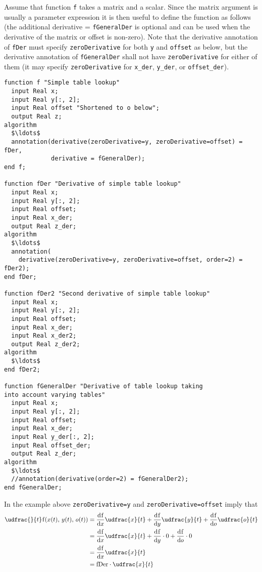 \begin{nonnormative}
Assume that function {\lstinline!f!} takes a matrix and a scalar.
Since the matrix argument is usually a parameter expression it is then
useful to define the function as follows (the additional derivative =
{\lstinline!fGeneralDer!} is optional and can be used when the derivative of
the matrix or offset is non-zero). Note that the derivative annotation of {\lstinline!fDer!} must specify
{\lstinline!zeroDerivative!} for both {\lstinline!y!} and {\lstinline!offset!} as below, but the derivative annotation of {\lstinline!fGeneralDer!} shall not have
{\lstinline!zeroDerivative!} for either of them (it may specify {\lstinline!zeroDerivative!} for {\lstinline!x_der!},
{\lstinline!y_der!}, or {\lstinline!offset_der!}).

\begin{lstlisting}[language=modelica]
function f "Simple table lookup"
  input Real x;
  input Real y[:, 2];
  input Real offset "Shortened to o below";
  output Real z;
algorithm
  $\ldots$
  annotation(derivative(zeroDerivative=y, zeroDerivative=offset) = fDer,
             derivative = fGeneralDer);
end f;

function fDer "Derivative of simple table lookup"
  input Real x;
  input Real y[:, 2];
  input Real offset;
  input Real x_der;
  output Real z_der;
algorithm
  $\ldots$
  annotation(
    derivative(zeroDerivative=y, zeroDerivative=offset, order=2) = fDer2);
end fDer;

function fDer2 "Second derivative of simple table lookup"
  input Real x;
  input Real y[:, 2];
  input Real offset;
  input Real x_der;
  input Real x_der2;
  output Real z_der2;
algorithm
  $\ldots$
end fDer2;

function fGeneralDer "Derivative of table lookup taking
into account varying tables"
  input Real x;
  input Real y[:, 2];
  input Real offset;
  input Real x_der;
  input Real y_der[:, 2];
  input Real offset_der;
  output Real z_der;
algorithm
  $\ldots$
  //annotation(derivative(order=2) = fGeneralDer2);
end fGeneralDer;
\end{lstlisting}
In the example above {\lstinline!zeroDerivative=y!} and {\lstinline!zeroDerivative=offset!} imply that
\begin{equation*}
\begin{aligned}
\udfrac{}{t}\text{{\lstinline!f!}}(x(t),\, y(t),\, o(t))
&= \pdfrac{\text{{\lstinline!f!}}}{x} \udfrac{x}{t} + \pdfrac{\text{{\lstinline!f!}}}{y} \udfrac{y}{t} + \pdfrac{\text{{\lstinline!f!}}}{o} \udfrac{o}{t}\\
&= \pdfrac{\text{{\lstinline!f!}}}{x} \udfrac{x}{t} + \pdfrac{\text{{\lstinline!f!}}}{y} \cdot 0 + \pdfrac{\text{{\lstinline!f!}}}{o} \cdot 0\\
&= \pdfrac{\text{{\lstinline!f!}}}{x} \udfrac{x}{t}\\
&= \text{{\lstinline!fDer!}} \cdot \udfrac{x}{t}
\end{aligned}
\end{equation*}
\end{nonnormative}

